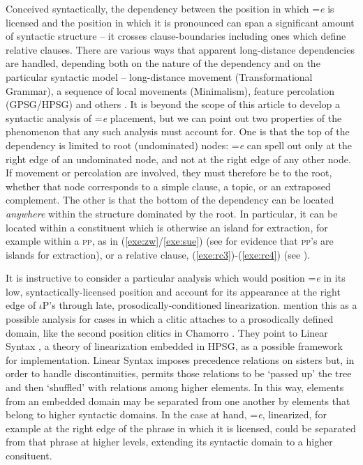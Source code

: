 \documentclass[output=paper,
modfonts
]{LSP/langsci}
\begin{document}
Conceived syntactically, the dependency between the position in which =\emph{e} is licensed and the position in 
which it is pronounced can span a significant amount of syntactic structure  --  it crosses clause-boundaries including ones
which define relative clauses. There are various ways that apparent long-distance dependencies are handled, depending
both on the nature of the dependency and on the particular syntactic model  -- 
long-distance movement (Transformational Grammar), a sequence of local movements (Minimalism), 
feature percolation (GPSG/HPSG) and others \citep{alexiadou2012a}. 
It is beyond the scope of this article to develop a syntactic analysis of =\emph{e} placement, but we can point out
two properties of the phenomenon that any such analysis must account for. 
One is that the top of the dependency is limited to root (undominated)
nodes: =\emph{e} can spell out only at the right edge of an undominated node, and not at the right edge of any other node. 
If movement or percolation are involved, they must therefore be to the root, whether that node corresponds to a simple clause,
a topic, or an extraposed complement. The other is that the bottom of the dependency can be located \emph{anywhere} 
within the structure dominated by the root. In particular, it can  be located within a constituent which is otherwise an island for extraction,
for example within a \textsc{pp}, as in (\ref{exe:zw}/\ref{exe:sue}) (see \citealt{aissen1996} for evidence that \textsc{pp}'s 
are islands for extraction), or a relative clause, (\ref{exe:rc3})\--(\ref{exe:rc4}) (see \citealt{aissen1992}). 

It is instructive to consider a particular analysis which would position =\emph{e} in its low, syntactically-licensed position 
and account  for its appearance at the right edge of $\iota$P's through late, prosodically-conditioned linearization.
  \citet{otero2011} mention this as a possible analysis for cases in which a clitic attaches to a 
 prosodically defined domain, like the second position clitics in Chamorro \citep{chung2003}. 
 They point to Linear Syntax \citep{kathol2004}, a theory of linearization embedded in
HPSG, as a possible framework for implementation. Linear Syntax imposes precedence relations on sisters but, in order to handle 
discontinuities, permits those relations to be `passed up' the tree and then `shuffled' with relations among higher elements. In this way, 
elements from an embedded domain may be separated from one another by elements that belong to higher syntactic domains.
In the case at hand, =\emph{e}, linearized, for example at the right edge of
the phrase in which it is licensed, could be separated from that phrase at higher levels, extending its syntactic domain to a higher 
consituent. 
\end{document}
